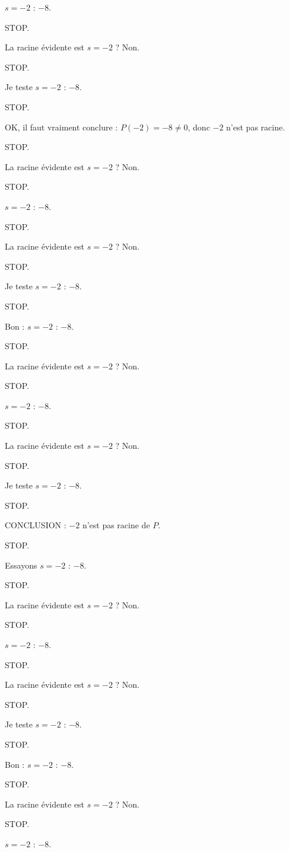 \documentclass[11pt]{article}
\begin{document}
\begin{exoresolu}
\begin{enumerate}
$s = -2$ : $-8$. 

STOP. 

La racine évidente est $s = -2$ ? Non. 

STOP. 

Je teste $s = -2$ : $-8$. 

STOP. 

OK, il faut vraiment conclure : $P(-2) = -8 \neq 0$, donc $-2$ n'est pas racine. 

STOP. 

La racine évidente est $s = -2$ ? Non. 

STOP. 

$s = -2$ : $-8$. 

STOP. 

La racine évidente est $s = -2$ ? Non. 

STOP. 

Je teste $s = -2$ : $-8$. 

STOP. 

Bon : $s = -2$ : $-8$. 

STOP. 

La racine évidente est $s = -2$ ? Non. 

STOP. 

$s = -2$ : $-8$. 

STOP. 

La racine évidente est $s = -2$ ? Non. 

STOP. 

Je teste $s = -2$ : $-8$. 

STOP. 

CONCLUSION : $-2$ n'est pas racine de $P$. 

STOP. 

Essayons $s = -2$ : $-8$. 

STOP. 

La racine évidente est $s = -2$ ? Non. 

STOP. 

$s = -2$ : $-8$. 

STOP. 

La racine évidente est $s = -2$ ? Non. 

STOP. 

Je teste $s = -2$ : $-8$. 

STOP. 

Bon : $s = -2$ : $-8$. 

STOP. 

La racine évidente est $s = -2$ ? Non. 

STOP. 

$s = -2$ : $-8$. 


\end{enumerate}
\end{exoresolu}
\end{document}
